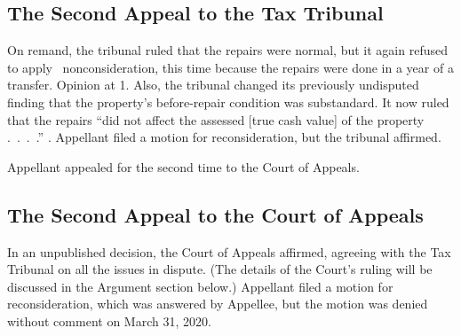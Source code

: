 \documentclass[12pt,\documentclassflag]{michiganCourtOfAppealsBrief}
\begin{document}



\subsection{The Second Appeal to the Tax Tribunal}

On remand, the tribunal ruled that the repairs were normal, but it again refused to apply \mathieuGast\ nonconsideration, this time because
the repairs were done in a year of a transfer. Opinion at 1. Also, the tribunal changed its previously undisputed finding that the property's before-repair condition was substandard. It now ruled that the repairs ``did not affect the assessed [true cash value] of the property .~.~.~.'' \Id. Appellant filed a motion for reconsideration, but the tribunal affirmed.

Appellant appealed for the second time to the Court of Appeals.

\subsection{The Second Appeal to the Court of Appeals}

In an unpublished decision, the Court of Appeals affirmed, agreeing with the Tax Tribunal on all the issues in dispute. (The details of the Court's ruling will be discussed in the Argument section below.) Appellant filed a motion for reconsideration, which was answered by Appellee, but the motion was denied without comment on March 31, 2020.
\end{document}

